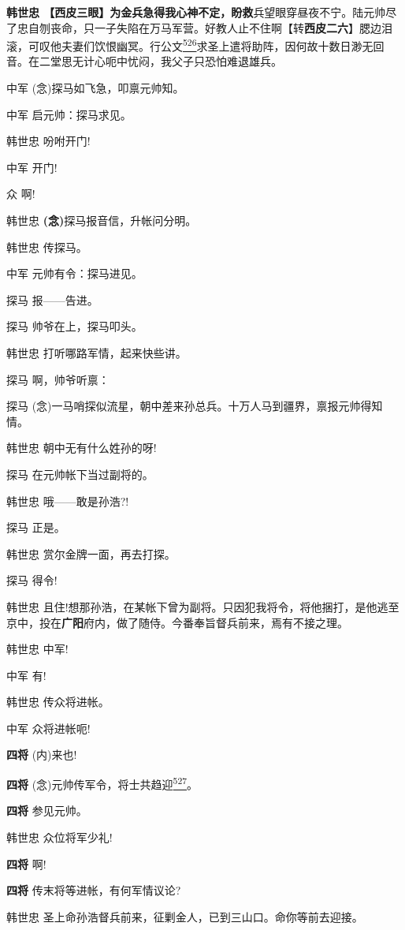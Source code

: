 \textbf{韩世忠
【西皮三眼】为金兵急得我心神不定，盼救}兵望眼穿昼夜不宁。陆元帅尽了忠自刎丧命，只一子失陷在万马军营。好教人止不住啊【转\textbf{西皮二六}】腮边泪滚，可叹他夫妻们饮恨幽冥。行公文\protect\hyperlink{fn526}{\textsuperscript{526}}求圣上遣将助阵，因何故十数日渺无回音。在二堂思无计心呃中忧闷，我父子只恐怕难退雄兵。

中军 (念)探马如飞急，叩禀元帅知。

中军 启元帅：探马求见。

韩世忠 吩咐开门!

中军 开门!

众 啊!

韩世忠 \textbf{(念)}探马报音信，升帐问分明。

韩世忠 传探马。

中军 元帅有令：探马进见。

探马 报------告进。

探马 帅爷在上，探马叩头。

韩世忠 打听哪路军情，起来快些讲。

探马 啊，帅爷听禀：

探马
(念)一马哨探似流星，朝中差来孙总兵。十万人马到疆界，禀报元帅得知情。

韩世忠 朝中无有什么姓孙的呀!

探马 在元帅帐下当过副将的。

韩世忠 哦------敢是孙浩?!

探马 正是。

韩世忠 赏尔金牌一面，再去打探。

探马 得令!

韩世忠
且住!想那孙浩，在某帐下曾为副将。只因犯我将令，将他捆打，是他逃至京中，投在\textbf{广阳}府内，做了随侍。今番奉旨督兵前来，焉有不接之理。

韩世忠 中军!

中军 有!

韩世忠 传众将进帐。

中军 众将进帐呃!

\textbf{四将} (内)来也!

\textbf{四将}
(念)元帅传军令，将士共趋迎\protect\hyperlink{fn527}{\textsuperscript{527}}。

\textbf{四将} 参见元帅。

韩世忠 众位将军少礼!

\textbf{四将} 啊!

\textbf{四将} 传末将等进帐，有何军情议论?

韩世忠 圣上命孙浩督兵前来，征剿金人，已到三山口。命你等前去迎接。

